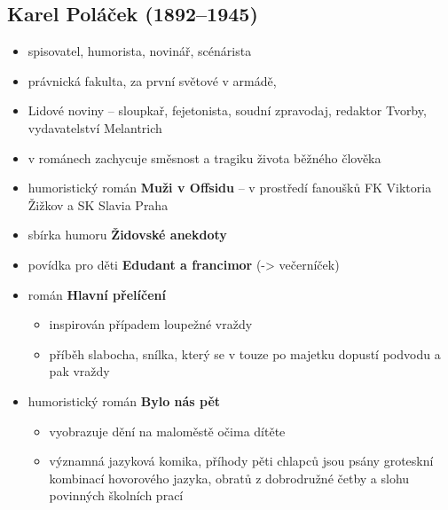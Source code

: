 \subsection{Karel Poláček (1892--1945)}
\begin{itemize}
\item spisovatel, humorista, novinář, scénárista
\item právnická fakulta, za první světové v armádě, 
\item Lidové noviny -- sloupkař, fejetonista, soudní zpravodaj, redaktor Tvorby, vydavatelství Melantrich
\item v románech zachycuje směsnost a tragiku života běžného člověka
\item humoristický román \textbf{Muži v Offsidu} -- v prostředí fanoušků FK Viktoria Žižkov a SK Slavia Praha
\item sbírka humoru \textbf{Židovské anekdoty}
\item povídka pro děti \textbf{Edudant a francimor} (-> večerníček)
\item román \textbf{Hlavní přelíčení} 
	\begin{itemize}
	\item inspirován případem loupežné vraždy
	\item příběh slabocha, snílka, který se v touze po majetku dopustí podvodu a pak vraždy
	\end{itemize}
\item humoristický román \textbf{Bylo nás pět}
	\begin{itemize}
	\item vyobrazuje dění na maloměstě očima dítěte
	\item významná jazyková komika, příhody pěti chlapců jsou psány groteskní kombinací hovorového jazyka, obratů z dobrodružné četby a slohu povinných školních prací
	\end{itemize}
\end{itemize}

